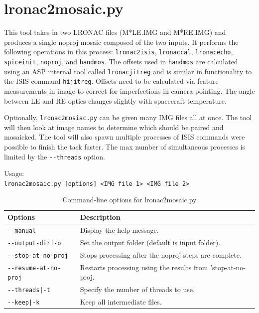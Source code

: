 \section{lronac2mosaic.py}
\label{lronac2mosaic}

This tool takes in two LRONAC files (M*LE.IMG and M*RE.IMG) and
produces a single noproj mosaic composed of the two inputs.  It
performs the following operations in this process:
\texttt{lronac2isis}, \texttt{lronaccal}, \texttt{lronacecho},
\texttt{spiceinit}, \texttt{noproj}, and \texttt{handmos}. The offsets
used in \texttt{handmos} are calculated using an ASP internal tool
called \texttt{lronacjitreg} and is similar in functionality to the
ISIS command \texttt{hijitreg}. Offsets need to be calculated via
feature measurements in image to correct for imperfections in camera
pointing. The angle between LE and RE optics changes slightly with
spacecraft temperature.

Optionally, \texttt{lronac2mosiac.py} can be given many IMG files all
at once. The tool will then look at image names to determine which
should be paired and mosaicked. The tool will also spawn multiple
processes of ISIS commands were possible to finish the task
faster. The max number of simultaneous processes is limited by the
\texttt{-\/-threads} option.

\medskip

Usage:\\
\hspace*{2em}\texttt{lronac2mosaic.py [options] <IMG file 1> <IMG file 2>}

\medskip

\begin{longtable}{|l|p{10cm}|}
\caption{Command-line options for lronac2mosaic.py}
\label{tbl:lronac2mosaic}
\endfirsthead
\endhead
\endfoot
\endlastfoot
\hline
Options & Description \\ \hline \hline
\texttt{-\/-manual} & Display the help message.\\ \hline
\texttt{-\/-output-dir|-o} & Set the output folder (default is input folder).\\ \hline
\texttt{-\/-stop-at-no-proj} & Stops processing after the noproj steps are complete. \\ \hline
\texttt{-\/-resume-at-no-proj} & Restarts processing using the results from 'stop-at-no-proj. \\ \hline
\texttt{-\/-threads|-t} & Specify the number of threads to use.\\ \hline
\texttt{-\/-keep|-k} & Keep all intermediate files.\\ \hline
\end{longtable}


